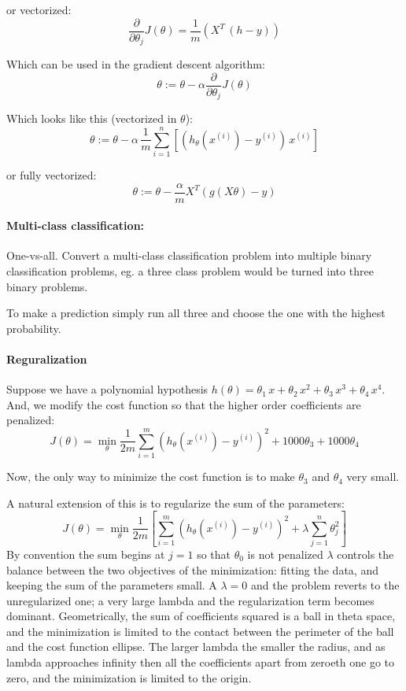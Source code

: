 \documentclass[12pt]{article}
\begin{document}
or vectorized:
\[
\frac{\partial}{\partial \theta_j} J(\theta) = \frac{1}{m} (X^T\, (h - y))
\]

Which can be used in the gradient descent algorithm:
\[
\theta := \theta - \alpha \frac{\partial}{\partial \theta_j} J(\theta)
\]

Which looks like this (vectorized in $\theta$):
\[
\theta := \theta - \alpha \, \frac{1}{m} \sum_{i=1}^n \left[ (h_\theta(x^{(i)}) - y^{(i)}) \, x^{(i)} \right]
\]

or fully vectorized:
\[
\theta := \theta - \frac{\alpha}{m} X^T (g(X\theta) - y)
\]


\paragraph{Multi-class classification:} One-vs-all. Convert a multi-class classification problem into multiple binary classification problems, eg. a three class problem would be turned into three binary problems. 

To make a prediction simply run all three and choose the one with the highest probability. 


\paragraph{Reguralization} Suppose we have a polynomial hypothesis $h(\theta) = \theta_1\,x + \theta_2\,x^2 + \theta_3\,x^3 + \theta_4\,x^4$. And, we modify the cost function so that the higher order coefficients are penalized:
\[
J(\theta) = \min_\theta \frac{1}{2m}\sum_{i=1}^{m} (h_\theta(x^{(i)})  - y^{(i)} )^2
+ 1000 \theta_3 + 1000\theta_4
\]

Now, the only way to minimize the cost function is to make $\theta_3$ and $\theta_4$ very small. 

A natural extension of this is to regularize the sum of the parameters:
\[
J(\theta) = \min_\theta \frac{1}{2m} \left[ \sum_{i=1}^{m} (h_\theta(x^{(i)})  - y^{(i)} )^2
+\lambda \sum_{j=1}^n \theta_j^2 \right]
\]
By convention the sum begins at $j=1$ so that $\theta_0$ is not penalized
$\lambda$ controls the balance between the two objectives of the minimization: fitting the data, and keeping the sum of the parameters small. A $\lambda = 0$ and the problem reverts to the unregularized one; a very large lambda and the regularization term becomes dominant. Geometrically, the sum of coefficients squared is a ball in theta space, and the minimization is limited to the contact between the perimeter of the ball and the cost function ellipse. The larger lambda the smaller the radius, and as lambda approaches infinity then all the coefficients apart from zeroeth one go to zero, and the minimization is limited to the origin. 
\end{document}
